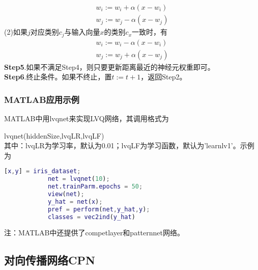             \begin{align*}
            w_i :=w_i + \alpha(x-w_i)\\
            w_j :=w_j - \alpha(x-w_j)
            \end{align*}
            (2)如果$j$对应类别$c_j$与输入向量$x$的类别$c_x$一致时，有
            \begin{align*}
            w_i :=w_i - \alpha(x-w_i)\\
            w_j :=w_j + \alpha(x-w_j)
            \end{align*}
            \textbf{Step5}.如果不满足Step4，则只要更新距离最近的神经元权重即可。\\
            \textbf{Step6}.终止条件。如果不终止，置$t:=t+1$，返回Step2。

        \subsubsection{MATLAB应用示例}
            \par
            MATLAB中用lvqnet来实现LVQ网络，其调用格式为
            \par
            lvqnet(hiddenSize,lvqLR,lvqLF)\\
            其中：lvqLR为学习率，默认为0.01；lvqLF为学习函数，默认为'learnlv1'。示例为
            \begin{lstlisting}[language = Matlab]
            [x,y] = iris_dataset;
            net = lvqnet(10);
            net.trainParm.epochs = 50;
            view(net);
            y_hat = net(x);
            pref = perform(net,y_hat,y);
            classes = vec2ind(y_hat)
            \end{lstlisting}
            注：MATLAB中还提供了competlayer和patternnet网络。

    \subsection{对向传播网络CPN}
